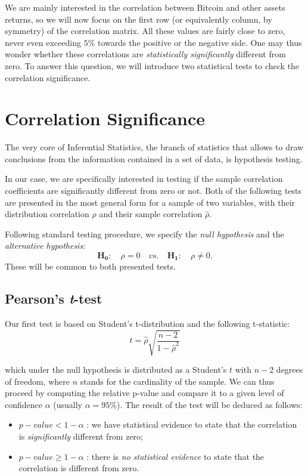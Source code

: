 We are mainly interested in the correlation between Bitcoin and other assets returns, so we will now focus on the first row (or equivalently column, by symmetry) of the correlation matrix.
All these values are fairly close to zero, never even  exceeding $5\%$ towards the positive or the negative side. 
One may thus wonder whether these correlations are \textit{statistically significantly} different from zero.
To answer this question, we will introduce two statistical tests to check the correlation significance.


\bigskip
\section{Correlation Significance}
\label{sec:corr_significance}
The very core of Inferential Statistics, the branch of statistics that allows to draw conclusions from the information contained in a set of data, is hypothesis testing. 

In our case, we are specifically interested in testing if the sample correlation coefficients are significantly different from zero or not.
Both of the following tests are presented in the most general form for a sample of two variables, with their distribution correlation $\rho$ and their sample correlation $\hat{\rho}$. 

Following standard testing procedure, we specify the \textit{null hypothesis} and the \textit{alternative hypothesis}:
\begin{equation*}
	\mathbf{H_{0}}: \quad \rho = 0 \quad vs. \quad	\mathbf{H_{1}}: \quad \rho \neq 0 .
\end{equation*}
These will be common to both presented tests.

\subsection{Pearson's \textit{t}-test}
Our first test is based on Student's t-distribution and the following t-statistic:
\begin{equation}
	t = \hat{\rho} \sqrt{\frac{n - 2}{1 - \hat{\rho}^2}}
\end{equation} 

which under the null hypothesis is distributed as a Student's $t$ with $n-2$ degrees of freedom, where $n$ stands for the cardinality of the sample.
We can thus proceed by computing the relative p-value and compare it to a given level of confidence $\alpha$ (usually $\alpha = 95\%$). 
The result of the test will be deduced as follows:
\begin{itemize}
	\item $p-value < 1 - \alpha$ : we have statistical evidence to state that the correlation is \textit{significantly} different from zero;
	\item $p-value \geq 1 - \alpha$ : there is \textit{no statistical evidence} to state that the correlation is different from zero.
\end{itemize}


